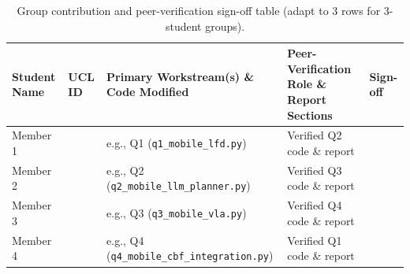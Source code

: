 \documentclass[11pt,a4paper]{article}
\begin{document}
\begin{table}[htbp]
    \centering
    \small
    \renewcommand{\arraystretch}{1.35}
    \begin{tabular}{@{} >{\raggedright\arraybackslash}p{2.3cm} >{\raggedright\arraybackslash}p{1.6cm} >{\raggedright\arraybackslash}p{5.4cm} >{\raggedright\arraybackslash}p{3.7cm} >{\raggedright\arraybackslash}p{1.5cm} @{}}
        \toprule
        \textbf{Student Name} & \textbf{UCL ID} & \textbf{Primary Workstream(s) \& Code Modified} & \textbf{Peer-Verification Role \& Report Sections} & \textbf{Sign-off} \\
        \midrule
        Member 1 & & e.g., Q1 (\texttt{q1\_mobile\_lfd.py}) & Verified Q2 code \& report & \\
        Member 2 & & e.g., Q2 (\texttt{q2\_mobile\_llm\_planner.py}) & Verified Q3 code \& report & \\
        Member 3 & & e.g., Q3 (\texttt{q3\_mobile\_vla.py}) & Verified Q4 code \& report & \\
        Member 4 & & e.g., Q4 (\texttt{q4\_mobile\_cbf\_integration.py}) & Verified Q1 code \& report & \\
        \bottomrule
    \end{tabular}
    \caption{Group contribution and peer-verification sign-off table (adapt to 3 rows for 3-student groups).}
    \label{tab:contributions}
\end{table}
\end{document}
